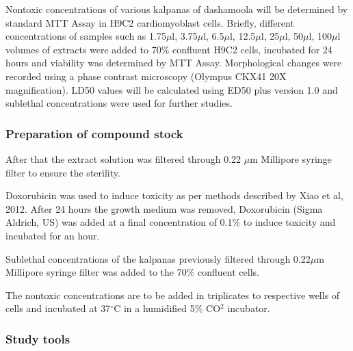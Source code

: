 \documentclass[11pt]{article} %
\begin{document}
Nontoxic concentrations of various kalpanas of dashamoola will be determined by standard
MTT Assay in H9C2 cardiomyoblast cells. Briefly, different concentrations of samples such as
1.75$\mu$l, 3.75$\mu$l, 6.5$\mu$l, 12.5$\mu$l, 25$\mu$l, 50$\mu$l, 100$\mu$l volumes of extracts were added to 70\% confluent H9C2 cells, incubated for 24 hours and viability was determined by MTT Assay. Morphological changes were recorded using a phase contrast microscopy (Olympus CKX41 20X magnification). LD50 values will be calculated using ED50 plus version 1.0 and sublethal concentrations were used for further studies.

\subsubsection{ Preparation of compound stock}
\label{subsubsec: Preparation of compound stock}

After that the extract solution was filtered through 0.22 $\mu$m Millipore syringe filter to
ensure the sterility.

Doxorubicin was used to induce toxicity as per methods described by Xiao et al, 2012. After 24
hours the growth medium was removed, Doxorubicin (Sigma Aldrich, US) was added at a final
concentration of 0.1\% to induce toxicity and incubated for an hour.

Sublethal concentrations of the kalpanas previously filtered through 0.22$\mu$m Millipore syringe filter was added to the 70\% confluent cells.

The nontoxic concentrations are to be added in triplicates to respective wells of cells and
incubated at 37$^{\circ}$C in a humidified 5\% CO$ ^{2} $ incubator.

\subsubsection{Study tools}
\label{subsubsec:Study tools}
\end{document}
